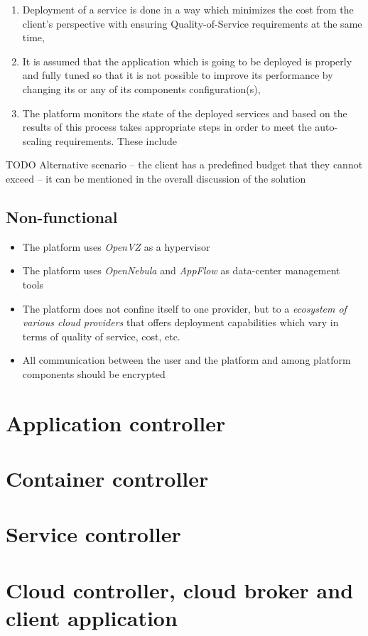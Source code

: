 \begin{enumerate}
\begin{itemize}
\begin{inparaenum}[i)]
      \end{inparaenum}
    \end{itemize}
  \item Deployment of a service is done in a way which minimizes the cost from the client's perspective with ensuring Quality-of-Service requirements at the same time,
  \item It is assumed that the application which is going to be deployed is properly and fully tuned so that it is not possible to improve its performance by changing its or any of its components configuration(s),
  \item The platform monitors the state of the deployed services and based on the results of this process takes appropriate steps in order to meet the auto-scaling requirements. These include
\end{enumerate}

TODO Alternative scenario -- the client has a predefined budget that they cannot exceed -- it can be mentioned in the overall discussion of the solution

\subsection{Non-functional}
\begin{itemize}
  \item The platform uses \emph{OpenVZ} as a hypervisor
  \item The platform uses \emph{OpenNebula} and \emph{AppFlow} as data-center management tools
  \item The platform does not confine itself to one provider, but to a \emph{ecosystem of various cloud providers} that offers deployment capabilities which vary in terms of quality of service, cost, etc.
  \item All communication between the user and the platform and among platform components should be encrypted
\end{itemize}

\section{Application controller}
\section{Container controller}
\section{Service controller}
\section{Cloud controller, cloud broker and client application}


